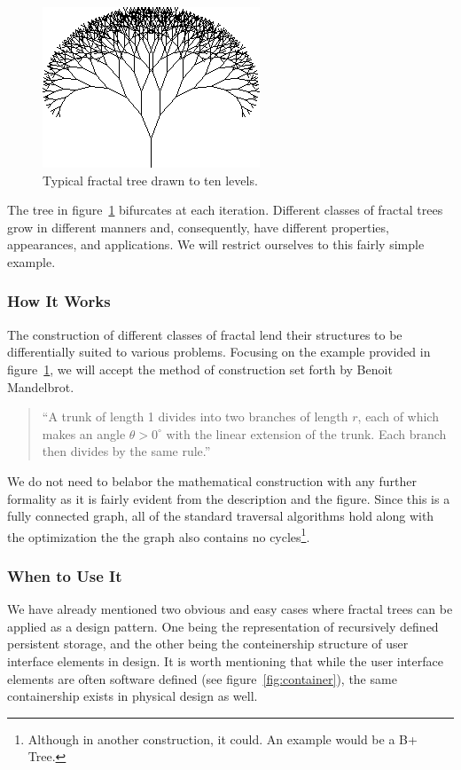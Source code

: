 \documentclass[jou,apacite]{apa6}
\begin{document}
\begin{figure}[htpb]
  \centering
  \includegraphics[width=0.75\columnwidth]{images/tree2.png}
  \caption{Typical fractal tree drawn to ten levels.}
  \label{fig:tree2}
\end{figure}

The tree in figure~\ref{fig:tree2} bifurcates at each iteration.  Different classes of fractal trees grow in different manners and, consequently, have different properties, appearances, and applications.  We will restrict ourselves to this fairly simple example.

\subsubsection{How It Works}
The construction of different classes of fractal lend their structures to be differentially suited to various problems.  Focusing on the example provided in figure~\ref{fig:tree2}, we will accept the method of construction set forth by Benoit Mandelbrot.
\begin{quote}
``A trunk of length 1 divides into two branches of length $r$, each of which makes an angle $\theta > 0^{\circ}$  with the linear extension of the trunk. Each branch then divides by the same rule.''~\cite{Mandelbrot}
\end{quote}
We do not need to belabor the mathematical construction with any further formality as it is fairly evident from the description and the figure.  Since this is a fully connected graph, all of the standard traversal algorithms hold along with the optimization the the graph also contains no cycles\footnote{Although in another construction, it could.  An example would be a B+ Tree.}.

\subsubsection{When to Use It}
We have already mentioned two obvious and easy cases where fractal trees can be applied as a design pattern.  One being the representation of recursively defined persistent storage, and the other being the conteinership structure of user interface elements in design.  It is worth mentioning that while the user interface elements are often software defined (see figure~\ref{fig:container}), the same containership exists in physical design as well.  
\end{document}
